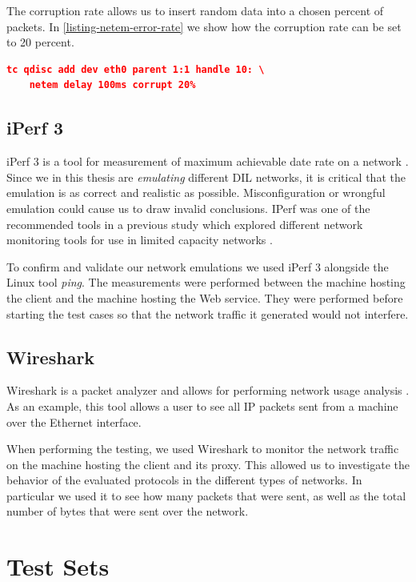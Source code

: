 The corruption rate allows us to insert random data into a chosen percent of
packets. In \cref{listing-netem-error-rate} we show how the corruption rate can
be set to 20 percent.

\begin{lstlisting}[frame=single, language=json, caption="Emulating the corruption rate", label=listing-netem-error-rate]
  tc qdisc add dev eth0 parent 1:1 handle 10: \
    netem delay 100ms corrupt 20%
\end{lstlisting}


\subsection{iPerf 3}

iPerf 3 is a tool for measurement of maximum achievable date rate on a network
\cite{iperf3-homepage}. Since we in this thesis are \textit{emulating} different
DIL networks, it is critical that the emulation is as correct and realistic as
possible. Misconfiguration or wrongful emulation could cause us to draw invalid
conclusions. IPerf was one of the recommended tools in a previous study which
explored different network monitoring tools for use in limited capacity
networks \cite{bloebaum-monitoring}.

To confirm and validate our network emulations we used iPerf 3 alongside the
Linux tool \textit{ping}. The measurements were performed between the machine
hosting the client and the machine hosting the Web service. They were performed
before starting the test cases so that the network traffic it generated would
not interfere.


\subsection{Wireshark}

Wireshark is a packet analyzer and allows for performing network usage analysis
\cite{wireshark-homepage}. As an example, this tool allows a user to see all IP
packets sent from a machine over the Ethernet interface.

When performing the testing, we used Wireshark to monitor the network traffic on
the machine hosting the client and its proxy. This allowed us to investigate the
behavior of the evaluated protocols in the different types of networks. In
particular we used it to see how many packets that were sent, as well as the
total number of bytes that were sent over the network.


\section{Test Sets}


